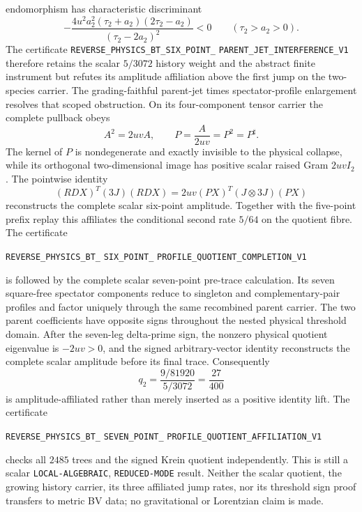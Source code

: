 \documentclass[11pt]{article}
\theoremstyle{definition}
\theoremstyle{remark}
\begin{document}
endomorphism has characteristic discriminant
\[
 -\frac{4u^2a_2^2(\tau_2+a_2)(2\tau_2-a_2)}
 {(\tau_2-2a_2)^2}<0
 \qquad (\tau_2>a_2>0).
\]
The certificate
\texttt{REVERSE\_PHYSICS\_BT\_SIX\_POINT\_}
\allowbreak\texttt{PARENT\_JET\_INTERFERENCE\_V1}
therefore retains the scalar $5/3072$ history weight and the abstract finite
instrument but refutes its amplitude affiliation above the first jump on the
two-species carrier.  The grading-faithful parent-jet times spectator-profile
enlargement resolves that scoped obstruction.  On its four-component tensor
carrier the complete pullback obeys
\[
 A^2=2uvA,\qquad P=\frac{A}{2uv}=P^2=P^\sharp .
\]
The kernel of $P$ is nondegenerate and exactly invisible to the physical
collapse, while its orthogonal two-dimensional image has positive scalar
raised Gram $2uvI_2$.  The pointwise identity
\[
 (RDX)^T(3J)(RDX)=2uv(PX)^T(J\otimes3J)(PX)
\]
reconstructs the complete scalar six-point amplitude.  Together with the
five-point prefix replay this affiliates the conditional second rate
$5/64$ on the quotient fibre.  The certificate
\par\noindent
\texttt{REVERSE\_PHYSICS\_BT\_}\allowbreak
\texttt{SIX\_POINT\_}\allowbreak
\texttt{PROFILE\_QUOTIENT\_COMPLETION\_V1}
\par\noindent
is followed by the complete scalar seven-point pre-trace calculation.  Its
seven square-free spectator components reduce to singleton and
complementary-pair profiles and factor uniquely through the same recombined
parent carrier.  The two parent coefficients have opposite signs throughout
the nested physical threshold domain.  After the seven-leg delta-prime sign,
the nonzero physical quotient eigenvalue is $-2uv>0$, and the signed
arbitrary-vector identity reconstructs the complete scalar amplitude before
its final trace.  Consequently
\[
 q_2=\frac{9/81920}{5/3072}=\frac{27}{400}
\]
is amplitude-affiliated rather than merely inserted as a positive identity
lift.  The certificate
\par\noindent
\texttt{REVERSE\_PHYSICS\_BT\_}\allowbreak
\texttt{SEVEN\_POINT\_}\allowbreak
\texttt{PROFILE\_QUOTIENT\_AFFILIATION\_V1}
\par\noindent
checks all $2485$ trees and the signed Krein quotient independently.  This is
still a scalar \texttt{LOCAL-}\allowbreak\texttt{ALGEBRAIC},
\texttt{REDUCED-}\allowbreak\texttt{MODE} result.  Neither
the scalar quotient, the growing history carrier, its three affiliated jump
rates, nor its threshold sign proof transfers to metric BV data; no
gravitational or Lorentzian claim is made.
\end{document}
